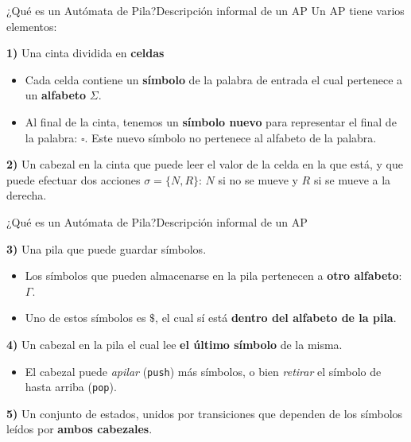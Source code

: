 \documentclass[spanish, handout]{beamer}
\begin{document}
\begin{frame}{¿Qué es un Autómata de Pila?}{Descripción informal de un AP}
    Un AP tiene varios elementos:
    \bigskip

    \textbf{1)} Una \alert{cinta} dividida en \textbf{celdas} \pause
    
    \begin{itemize}
        \item Cada celda contiene un \textbf{símbolo} de la palabra de entrada el cual pertenece a un \textbf{alfabeto} $\Sigma$. \pause
        \item  Al final de la cinta, tenemos un \textbf{símbolo nuevo} para representar el \alert{final de la palabra}: $\square$. Este nuevo símbolo no pertenece al alfabeto de la palabra. \pause
    \end{itemize}

    \textbf{2)} Un \alert{cabezal en la cinta} que puede leer el valor de la celda en la que está, y que puede efectuar dos acciones $\sigma = \{N,R\}$: $N$ si no se mueve y $R$ si se mueve a la derecha. \pause

    \begin{center}
    \end{center}
\end{frame}

\begin{frame}{¿Qué es un Autómata de Pila?}{Descripción informal de un AP}

    \textbf{3)} Una \alert{pila} que puede guardar símbolos. \pause

    \begin{itemize}
        \item Los símbolos que pueden almacenarse en la pila pertenecen a \textbf{otro alfabeto}: $\Gamma$. \pause
        \item Uno de estos símbolos es $\$$, el cual sí está \textbf{dentro del alfabeto de la pila}. \pause
    \end{itemize}

    \bigskip

    \textbf{4)} Un \alert{cabezal en la pila} el cual lee \textbf{el último símbolo} de la misma. \pause

    \begin{itemize}
        \item El cabezal puede \textit{apilar} (\alert{\texttt{push}}) más símbolos, o bien \textit{retirar} el símbolo de hasta arriba (\alert{\texttt{pop}}). \pause
    \end{itemize}

    \bigskip

    \textbf{5)} Un conjunto de \alert{estados}, unidos por \alert{transiciones} que dependen de los símbolos leídos por \textbf{ambos cabezales}.

\end{frame}
\end{document}

